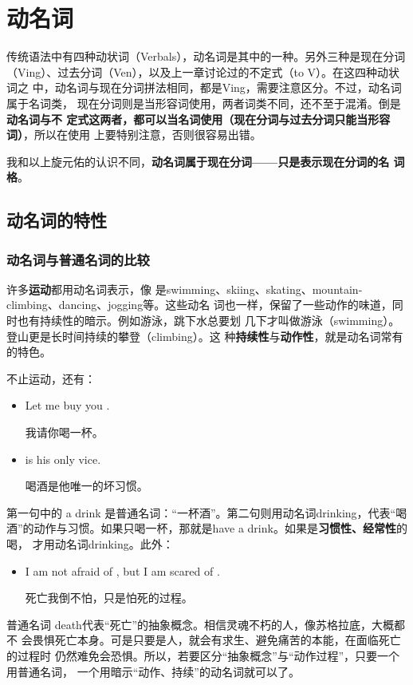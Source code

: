\chapter{动名词}

传统语法中有四种动状词（Verbals），动名词是其中的一种。另外三种是现在分词
（Ving）、过去分词（Ven），以及上一章讨论过的不定式（to V）。在这四种动状词之
中，动名词与现在分词拼法相同，都是Ving，需要注意区分。不过，动名词属于名词类，
现在分词则是当形容词使用，两者词类不同，还不至于混淆。倒是\textbf{动名词与不
  定式这两者，都可以当名词使用（现在分词与过去分词只能当形容词）}，所以在使用
上要特别注意，否则很容易出错。

我和以上旋元佑的认识不同，\textbf{动名词属于现在分词——只是表示现在分词的名
  词格}。

\section{动名词的特性}

\subsection{动名词与普通名词的比较}

许多\textbf{运动}都用动名词表示，像
是swimming、skiing、skating、mountain-climbing、dancing、jogging等。这些动名
词也一样，保留了一些动作的味道，同时也有持续性的暗示。例如游泳，跳下水总要划
几下才叫做游泳（swimming）。登山更是长时间持续的攀登（climbing）。这
种\textbf{持续性}与\textbf{动作性}，就是动名词常有的特色。

不止运动，还有：
\begin{itemize}
\item Let me buy you .

  我请你喝一杯。
\item {} is his only vice.

  喝酒是他唯一的坏习惯。
\end{itemize}

第一句中的 a drink 是普通名词：“一杯酒”。第二句则用动名词drinking，代表“喝
酒”的动作与习惯。如果只喝一杯，那就是have a drink。如果是\textbf{习惯性、经常性}的喝，
才用动名词drinking。此外：
\begin{itemize}
\item I am not afraid of , but I am scared of .

  死亡我倒不怕，只是怕死的过程。
\end{itemize}

普通名词 death代表“死亡”的抽象概念。相信灵魂不朽的人，像苏格拉底，大概都不
会畏惧死亡本身。可是只要是人，就会有求生、避免痛苦的本能，在面临死亡的过程时
仍然难免会恐惧。所以，若要区分“抽象概念”与“动作过程”，只要一个用普通名词，
一个用暗示“动作、持续”的动名词就可以了。

